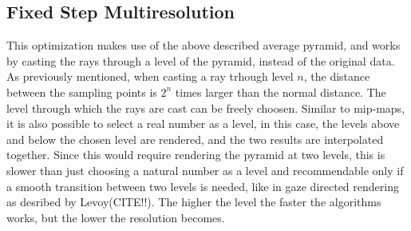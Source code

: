 \subsection{Fixed Step Multiresolution}
This optimization makes use of the above described average pyramid, and works by casting the rays through a level of the pyramid, instead of the original data. As previously mentioned, when casting a ray trhough level $n$, the distance between the sampling points is $2^n$ times larger than the normal distance. The level through which the rays are cast can be freely choosen. Similar to mip-maps, it is also possible to select a real number as a level, in this case, the levels above and below the chosen level are rendered, and the two results are interpolated together. Since this would require rendering the pyramid at two levels, this is slower than just choosing a natural number as a level and recommendable only if a smooth transition between two levels is needed, like in gaze directed rendering as desribed by Levoy(CITE!!). The higher the level the faster the algorithms works, but the lower the resolution becomes.

